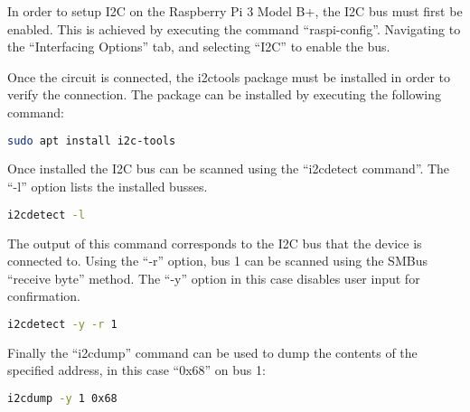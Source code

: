 In order to setup I2C on the Raspberry Pi 3 Model B+, the I2C bus must first be
enabled. This is achieved by executing the command ``raspi-config''. Navigating
to the ``Interfacing Options'' tab, and selecting ``I2C'' to enable the bus.

Once the circuit is connected, the i2ctools package must be installed in order
to verify the connection. The package can be installed by executing the
following command:

\begin{lstlisting}[language=bash]
	sudo apt install i2c-tools
\end{lstlisting}

Once installed the I2C bus can be scanned using the ``i2cdetect command''. The
``-l'' option lists the installed busses.

\begin{lstlisting}[language=bash]
	i2cdetect -l
\end{lstlisting}

The output of this command corresponds to the I2C bus that the device is
connected to. Using the ``-r'' option, bus 1 can be scanned using
the SMBus ``receive byte'' method. The ``-y'' option in this case disables user
input for confirmation.

\begin{lstlisting}[language=bash]
	i2cdetect -y -r 1
\end{lstlisting}

Finally the ``i2cdump'' command can be used to dump the contents of the
specified address, in this case ``0x68'' on bus 1:

\begin{lstlisting}[language=bash]
	i2cdump -y 1 0x68
\end{lstlisting}
